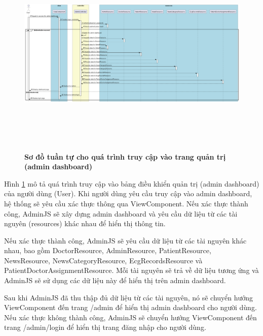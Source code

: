 \begin{figure}[H]
  \centering
  \includegraphics[width=16cm,height=10cm]{Images/server/sequence/web/seq_auth.png}
  \caption[Sơ đồ tuần tự cho quá trình truy cập vào trang quản trị (admin dashboard) ]{\bfseries \fontsize{12pt}{0pt}
  \selectfont Sơ đồ tuần tự cho quá trình truy cập vào trang quản trị (admin dashboard) }
  \label{seq_auth} %
\end{figure}
Hình \ref{seq_auth} mô tả quá trình truy cập vào bảng điều khiển quản trị (admin dashboard) của người dùng (User). Khi người dùng yêu cầu truy cập vào admin dashboard, hệ thống sẽ yêu cầu xác thực thông qua ViewComponent. Nếu xác thực thành công, AdminJS sẽ xây dựng admin dashboard và yêu cầu dữ liệu từ các tài nguyên (resources) khác nhau để hiển thị thông tin.



Nếu xác thực thành công, AdminJS sẽ yêu cầu dữ liệu từ các tài nguyên khác nhau, bao gồm DoctorResource, AdminResource, PatientResource, NewsResource, NewsCategoryResource, EcgRecordsResource và PatientDoctorAssignmentResource. Mỗi tài nguyên sẽ trả về dữ liệu tương ứng và AdminJS sẽ sử dụng các dữ liệu này để hiển thị trên admin dashboard.



Sau khi AdminJS đã thu thập đủ dữ liệu từ các tài nguyên, nó sẽ chuyển hướng ViewComponent đến trang /admin để hiển thị admin dashboard cho người dùng. Nếu xác thực không thành công, AdminJS sẽ chuyển hướng ViewComponent đến trang /admin/login để hiển thị trang đăng nhập cho người dùng.



